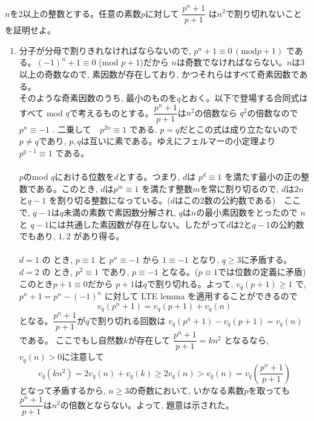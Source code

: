 $n$を2以上の整数とする。任意の素数$p$に対して $\dfrac{p^n+1}{p+1}$ は$n^2$で割り切れないことを証明せよ。
\enthm
\begin{enumerate}
\item[] 分子が分母で割りきれなければならないので, $p^n+1\equiv 0 \, (\mbox{mod} p+1)$ である。$(-1)^n+1\equiv 0$ (mod  $p+1$)だから $n$は奇数でなければならない。$n$は3以上の奇数なので, 素因数が存在しており, かつそれらはすべて奇素因数である。\\
そのような奇素因数のうち, 最小のものを$q$とおく。以下で登場する合同式はすべて mod $q$で考えるものとする。$\dfrac{p^n+1}{p+1}$は$n^2$の倍数なら $q^2$の倍数なので $p^n\equiv -1$ . 二乗して　$p^{2n}\equiv 1$  である. $p=q$だとこの式は成り立たないので $p\neq q$であり, $p,q$は互いに素である。ゆえにフェルマーの小定理より $p^{q-1}\equiv 1$ である。\\
\\
$p$のmod $q$における位数を$d$とする。つまり, $d$は $p^d\equiv 1$ を満たす最小の正の整数である。このとき, $d$は$p^m\equiv 1$  を満たす整数$m$を常に割り切るので, $d$は$2n$と$q-1$ を割り切る整数になっている。($d$はこの2数の公約数である)　ここで, $q-1$は$q$未満の素数で素因数分解され, $q$は$n$の最小素因数をとったので $n$ と $q-1$には共通した素因数が存在しない。したがって$d$は$2$と$q-1$の公約数でもあり, $1,2$ があり得る。\\
\\
$d=1$ の とき, $p\equiv 1$ と $p^n\equiv -1$ から $1\equiv -1$ となり, $q\geq 3$に矛盾する。\\
$d=2$ の とき, $p^2\equiv 1$ であり,  $p\equiv -1$ となる。($p\equiv 1$では位数の定義に矛盾)\\
このとき$p+1\equiv 0$だから $p+1$は$q$で割り切れる。よって, $v_{q}(p+1)\geq 1$ で, $p^n+1=p^n-(-1)^n$ に対して LTE lemma を適用することができるので
\[v_q(p^n+1)=v_q(p+1)+v_q(n)\]
となる。$\dfrac{p^n+1}{p+1}$が$q$で割り切れる回数は $v_q{(p^n+1)}-v_q(p+1)=v_q(n)$ である。 ここでもし自然数$k$が存在して $\dfrac{p^n+1}{p+1}=kn^2$ となるなら, $v_q(n)>0$に注意して
\[v_q(kn^2)=2v_q(n)+v_q(k)\geq 2v_q(n)>v_q(n)=v_q\left(\dfrac{p^n+1}{p+1}\right)\]
となって矛盾するから, $n\geq 3$の奇数において, いかなる素数$p$を取っても $\dfrac{p^n+1}{p+1}$は$n^2$の倍数とならない。よって, 題意は示された。
\end{enumerate}
